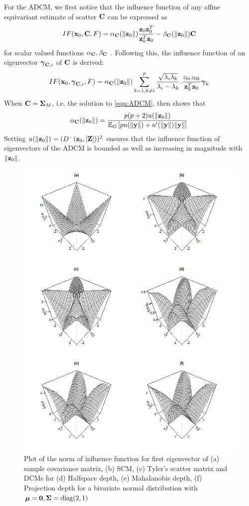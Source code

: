 For the ADCM, we first notice that the influence function of any affine equivariant estimate of scatter ${\mathbf{C}}$ can be expressed as
%
$$
IF({\bf{x}}_0, {\mathbf{C}}, F) = \alpha_{\mathbf{C}} (\| {\bf{z}}_0 \| ) \frac{{\bf{z}}_0 {\bf{z}}_0^T}{ {\bf{z}}_0^T {\bf{z}}_0} - \beta_{\mathbf{C}}( \| {\bf{z}}_0 \| ) {\mathbf{C}}
$$
%
for scalar valued functions $\alpha_{\mathbf{C}}, \beta_{\mathbf{C}}$ \citep{HampelBook86}. Following this, the influence function of an eigenvector ${\boldsymbol{\gamma}}_{{\mathbf{C}},i}$ of ${\mathbf{C}}$ is derived:
%
$$
IF({\bf{x}}_0, {\boldsymbol{\gamma}}_{{\mathbf{C}},i}, F) = \alpha_{\mathbf{C}}(\| {\bf{z}}_0 \|) \sum_{k=1, k \neq i}^p \frac{\sqrt {\lambda_i \lambda_k}}{\lambda_i - \lambda_k}. \frac{z_{0i} z_{0k}}{{\bf{z}}_0^T {\bf{z}}_0} {\boldsymbol{\gamma}}_k
$$
%
When ${\mathbf{C}}={\boldsymbol{\Sigma}}_M$, i.e. the solution to \ref{eqn:ADCM}, then \cite{HuberBook81} shows that
%
$$
\alpha_{\mathbf{C}} (\| {\bf{z}}_0 \|) = \frac{p(p+2) u (\| {\bf{z}}_0 \|)}{ {\mathbb{E}}_G \left[ p u(\| {\bf{y}} \| ) + u'(\| {\bf{y}} \|) \| {\bf{y}} \| \right] }
$$
%
Setting $u( \| {\bf{z}}_0 \|) = ( D^- ({\bf{z}}_0, [{\mathbf{Z}}]))^2$ ensures that the influence function of eigenvectors of the ADCM is bounded as well as increasing in magnitude with $\| {\bf{z}}_0 \|$.

\begin{figure}
	\centering
		\includegraphics[width=12cm]{IFnorm.png}
	\caption{Plot of the norm of influence function for first eigenvector of (a) sample covariance matrix, (b) SCM, (c) Tyler's scatter matrix and DCMs for (d) Halfspace depth, (e) Mahalanobis depth, (f) Projection depth for a bivariate normal distribution with ${\boldsymbol{\mu}} = {\bf 0}, {\boldsymbol{\Sigma}} = \operatorname*{diag}(2,1)$}
	\label{fig:IFnorm}
\end{figure}

